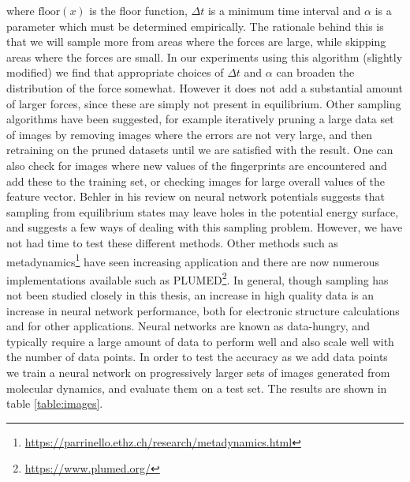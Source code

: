where $\text{floor}(x)$ is the floor function,
$\Delta t$ is a minimum time interval and $\alpha$ is a parameter
which must be determined empirically.
The rationale behind this is that we will sample more from
areas where the forces are large, while skipping areas
where the forces are small.
In our experiments using this algorithm (slightly modified)
we find that appropriate choices of $\Delta t$ and $\alpha$
can broaden the distribution of the force somewhat.
However it does not add a substantial amount of larger forces, since
these are simply not present in equilibrium.
Other sampling algorithms have been suggested, for example iteratively
pruning a large data set of images by removing images where
the errors are not very large, and then retraining on the pruned datasets
until we are satisfied with the result.
One can also check for images where new values of the fingerprints
are encountered and add these to the training set, or checking
images for large overall values of the feature vector. 
Behler in his review\cite{behler2011neural} on neural network potentials
suggests that sampling from equilibrium states may leave holes
in the potential energy surface, and suggests a few ways of dealing
with this sampling problem.
However, we have not had time to test these different methods.
Other methods such as metadynamics\footnote{
\url{https://parrinello.ethz.ch/research/metadynamics.html}}
have seen increasing application and there are now numerous implementations
available such as PLUMED\footnote{\url{https://www.plumed.org/}}.
In general, though sampling has not been studied closely in this thesis,
an increase in high quality data is an increase in neural network
performance, both for electronic structure calculations
and for other applications.
Neural networks are known as data-hungry, and typically require
a large amount of data to perform well and also scale well
with the number of data points. 
In order to test the accuracy as we add data points
we train a neural network on progressively larger sets of images generated 
from molecular dynamics, and evaluate them on a test set.
The results are shown in table \ref{table:images}.

